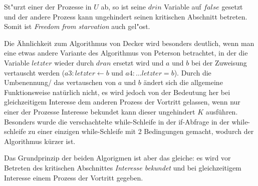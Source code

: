 \documentclass[a4paper,twoside,12pt,fleqn]{article}
\begin{document}
\begin{description}
	St"urzt einer der Prozesse in $U$ ab, so ist seine $drin$ Variable auf $false$
	gesetzt und der andere Prozess kann ungehindert seinen kritischen Abschnitt
	betreten. Somit ist \emph{Freedom from starvation} auch gel"ost.

	Die Ähnlichkeit zum Algorithmus von Decker wird besonders deutlich, wenn man
	eine etwas andere Variante des Algorithmus von Peterson betrachtet, in der
	die Variable $letzter$ wieder durch $dran$ ersetzt wird und $a$ und $b$ bei der
	Zuweisung vertauscht werden ($a3: letzter \leftarrow b$ und
	$a4: \dots letzter = b$). Durch die Umbenennung/ das vertauschen von $a$ und $b$
	ändert sich die allgemeine Funktionsweise natürlich nicht, es wird jedoch von
	der Bedeutung her bei gleichzeitigem Interesse dem anderen Prozess der Vortritt
	gelassen, wenn nur einer der Prozesse Interesse bekundet kann dieser ungehindert
	$K$ ausführen. Besonders wurde die verschachtelte while-Schleife in der if-Abfrage
	in der while-schleife zu einer einzigen while-Schleife mit 2 Bedingungen gemacht,
	wodurch der Algorithmus kürzer ist.

	Das Grundprinzip der beiden Algorigmen ist aber das gleiche: es wird vor
	Betreten des kritischen Abschnittes \emph{Interesse bekundet} und bei gleichzeitigem
	Interesse einem Prozess der Vortritt gegeben.
\end{description}
\end{document}
